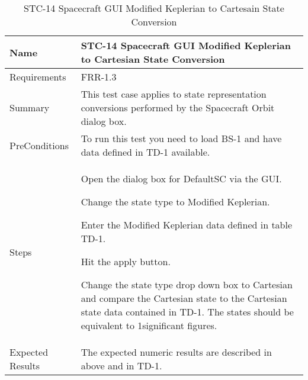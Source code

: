 
\begin{table}[htbp!]
\centering
      \begin{tabular}{|p{1.05 in} |p{4.75 in} |}
      \hline
         \rowcolor[rgb]{0.8,0.8,0.8} Name & STC-14 Spacecraft GUI Modified Keplerian to Cartesian State Conversion\\
         \hline
         Requirements & FRR-1.3\\ \hline
         Summary &
         This test case applies to state representation conversions performed by the Spacecraft Orbit dialog box.   \\
         \hline
         PreConditions & To run this test you need to load BS-1 and have data defined in TD-1 available.\\
         \hline
         Steps &
         \begin{compactenum}
         \item Open the dialog box for DefaultSC via the GUI.
         \item Change the state type to Modified Keplerian.
         \item Enter the Modified Keplerian data defined in table TD-1.
         \item Hit the apply button.
         \item Change the state type drop down box to Cartesian and compare the Cartesian state to the
         Cartesian state data contained in TD-1. The states should be equivalent to 1significant figures.
         \end{compactenum}\\
         \hline
         Expected Results & The expected numeric results are described in above and in TD-1.\\
      \hline
\end{tabular}
      \label{Table: STC-14}
      \caption{STC-14 Spacecraft GUI Modified Keplerian to Cartesain State Conversion}
\end{table} 